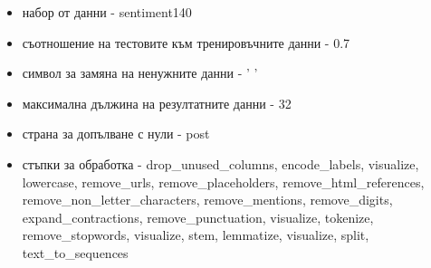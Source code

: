 \documentclass{article}
\begin{document}
\begin{itemize}
  \begin{itemize}
    \item набор от данни - sentiment140
    \item съотношение на тестовите към тренировъчните данни - 0.7
    \item символ за замяна на ненужните данни - ' '
    \item максимална дължина на резултатните данни - 32
    \item страна за допълване с нули - post
    \item стъпки за обработка - drop\_unused\_columns, encode\_labels, visualize, lowercase, remove\_urls,
    remove\_placeholders, remove\_html\_references, remove\_non\_letter\_characters, remove\_mentions,
    remove\_digits, expand\_contractions, remove\_punctuation, visualize, tokenize, remove\_stopwords, visualize,
    stem, lemmatize, visualize, split, text\_to\_sequences
  \end{itemize}


\end{itemize}
\end{document}
